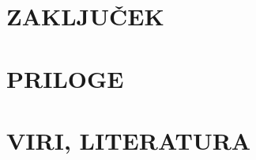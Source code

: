 \documentclass[12pt, a4paper, oneside]{report}
\begin{document}
\chapter{ZAKLJUČEK}

\chapter{PRILOGE}

\chapter{VIRI, LITERATURA}
%
\end{document}
